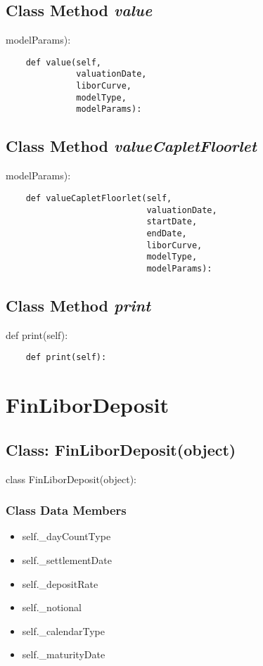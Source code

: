 \documentclass[twoside,11pt]{book}
\begin{document}
\subsection{Class Method {\it value}}
modelParams):

\begin{lstlisting}
    def value(self,
              valuationDate,
              liborCurve,
              modelType,
              modelParams):
\end{lstlisting}

\subsection{Class Method {\it valueCapletFloorlet}}
modelParams):

\begin{lstlisting}
    def valueCapletFloorlet(self,
                            valuationDate,
                            startDate,
                            endDate,
                            liborCurve,
                            modelType,
                            modelParams):
\end{lstlisting}

\subsection{Class Method {\it print}}
def print(self):

\begin{lstlisting}
    def print(self):
\end{lstlisting}

\newpage
\section{FinLiborDeposit}

\subsection{Class: FinLiborDeposit(object)}
class FinLiborDeposit(object):

\subsubsection{Class Data Members}
\begin{itemize}
\item{self.\_dayCountType}
\item{self.\_settlementDate}
\item{self.\_depositRate}
\item{self.\_notional}
\item{self.\_calendarType}
\item{self.\_maturityDate}
\end{itemize}
\end{document}
